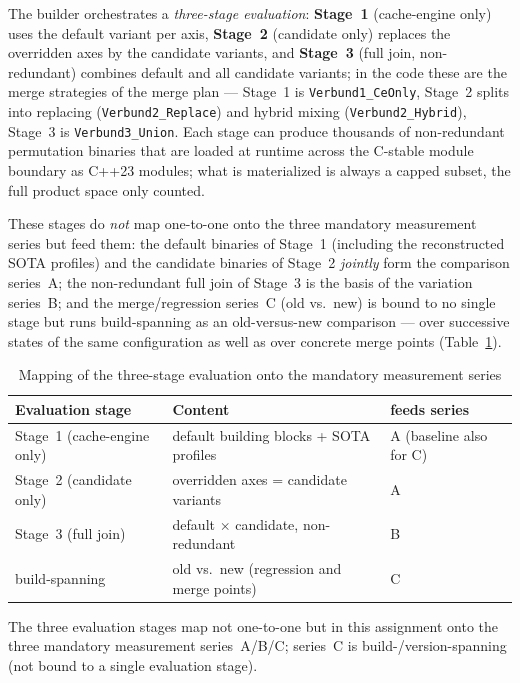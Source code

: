 \begin{nurkurz}
The builder orchestrates a \emph{three-stage evaluation}: \textbf{Stage~1} (cache-engine only) uses the
default variant per axis, \textbf{Stage~2} (candidate only) replaces the overridden axes by the
candidate variants, and \textbf{Stage~3} (full join, non-redundant) combines default and all candidate
variants; in the code these are the merge strategies of the merge plan --- Stage~1 is
\texttt{Verbund1\_CeOnly}, Stage~2 splits into replacing (\texttt{Verbund2\_Replace}) and hybrid mixing
(\texttt{Verbund2\_Hybrid}), Stage~3 is \texttt{Verbund3\_Union}. Each stage can produce thousands of
non-redundant permutation binaries that are loaded at runtime across the C-stable module boundary as
C++23 modules; what is materialized is always a capped subset, the full product space only counted.

These stages do \emph{not} map one-to-one onto the three mandatory measurement series but feed them: the
default binaries of Stage~1 (including the reconstructed SOTA profiles) and the candidate binaries of
Stage~2 \emph{jointly} form the comparison series~A\@; the non-redundant full join of Stage~3 is
the basis of the variation series~B\@; and the merge/regression series~C (old vs.\ new) is bound to
no single stage but runs build-spanning as an old-versus-new comparison --- over
successive states of the same configuration as well as over concrete merge points
(Table~\ref{tab:stage-series}).

\begin{table}[!htbp]
  \centering
  \caption{Mapping of the three-stage evaluation onto the mandatory measurement series}\label{tab:stage-series}
  \begin{tabular}{@{}lll@{}}
    \toprule
    \textbf{Evaluation stage} & \textbf{Content} & \textbf{feeds series} \\
    \midrule
    Stage~1 (cache-engine only) & default building blocks + SOTA profiles & A (baseline also for C) \\
    Stage~2 (candidate only) & overridden axes = candidate variants & A \\
    Stage~3 (full join) & default $\times$ candidate, non-redundant & B \\
    build-spanning & old vs.\ new (regression and merge points) & C \\
    \bottomrule
  \end{tabular}

  \smallskip
  {\footnotesize The three evaluation stages map not one-to-one but in this assignment onto the
  three mandatory measurement series~A/B/C\@; series~C is build-/version-spanning (not bound to a single
  evaluation stage).\par}
\end{table}


\end{nurkurz}
